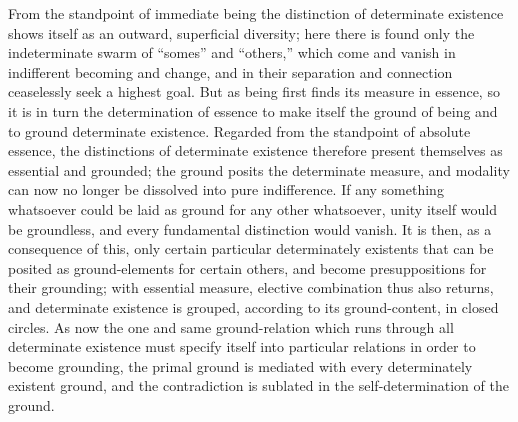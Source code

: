 \documentclass[12pt,a4paper,openany]{book}
\newcommand{\opage}[1]{\marginnote{\footnotesize\textit{[#1]}}}
\begin{document}
From the standpoint of immediate being the distinction of determinate existence
shows itself as an outward, superficial diversity;
here there is found only the indeterminate swarm of
``somes'' and ``others,'' which come and vanish in indifferent
becoming and change, and in their separation and
connection ceaselessly seek a highest goal. But
as being first finds its measure in essence, so it is
in turn the determination of essence to make itself the ground of
being and to ground determinate existence. Regarded from the standpoint of
absolute essence, the distinctions of determinate existence therefore present
themselves as essential and grounded;
the ground posits the determinate measure, and modality can
now no longer be dissolved into pure indifference. If
any something whatsoever could be laid as ground for any
other whatsoever, unity itself would be groundless,
and every fundamental distinction would vanish. It is then,
as a consequence of this, only certain particular determinately existents that
can be posited as ground-elements for certain others, and
become presuppositions for their grounding; with
essential measure, elective combination thus also returns,
and determinate existence is grouped, according to its ground-content,
in closed circles. As now the one and same
ground-relation which runs through all determinate existence must
specify itself into particular relations in order to become grounding,
the primal ground is mediated with every determinately existent
\setcounter{footnote}{0}%
\opage{136}ground, and the contradiction is sublated in the self-determination of the ground.
\end{document}
